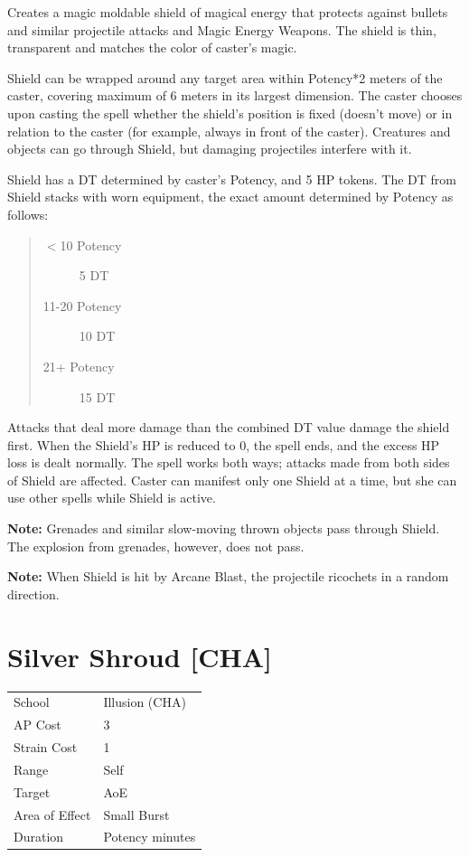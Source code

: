\documentclass[11pt,a4paper,twocolumn]{book}
\begin{document}
\medskip

Creates a magic moldable shield of magical energy that protects against bullets and similar projectile attacks and Magic Energy Weapons. The shield is thin, transparent and matches the color of caster's magic.
 
Shield can be wrapped around any target area within Potency*2 meters of the caster, covering maximum of 6 meters in its largest dimension. The caster chooses upon casting the spell whether the shield's position is fixed (doesn't move) or in relation to the caster (for example, always in front of the caster). Creatures and objects can go through Shield, but damaging projectiles interfere with it.

Shield has a DT determined by caster's Potency, and 5 HP tokens. The DT from Shield stacks with worn equipment, the exact amount determined by Potency as follows:
\begin{quote}
	\begin{description}
  		\item[$<$10 Potency] 	5 DT
  		\item[11-20 Potency] 	10 DT
  		\item[21+ Potency] 		15 DT
	\end{description}
\end{quote}

Attacks that deal more damage than the combined DT value damage the shield first. When the Shield's HP is reduced to 0, the spell ends, and the excess HP loss is dealt normally. The spell works both ways; attacks made from both sides of Shield are affected. Caster can manifest only one Shield at a time, but she can use other spells while Shield is active.

\textbf{Note:} Grenades and similar slow-moving thrown objects pass through Shield. The explosion from grenades, however, does not pass.

\textbf{Note:} When Shield is hit by Arcane Blast, the projectile ricochets in a random direction.


\section*{Silver Shroud [CHA]}
{
	\begin{tabu} to 75mm{| X[l,4] | X[l,7] |}
		\hline
		School 			& Illusion (CHA) 		\\
        AP Cost	      	& 3 					\\
        Strain Cost     & 1 					\\
        Range     		& Self					\\
        Target      	& AoE					\\
        Area of Effect  & Small Burst  	 		\\
        Duration     	& Potency minutes		\\ \hline
	\end{tabu}
		
}
\end{document}
